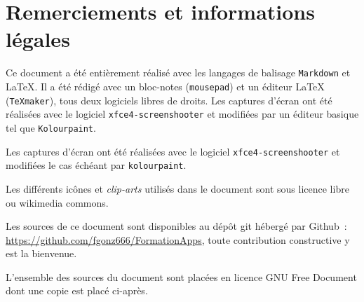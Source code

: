 \chapter{Remerciements et informations légales}

Ce document a été entièrement réalisé avec les langages de balisage \texttt{Markdown} et \LaTeX{}. 
Il a été rédigé avec un bloc-notes (\texttt{mousepad}) et un éditeur \LaTeX{} (\texttt{\TeX{}maker}), tous deux logiciels libres de droits.
Les captures d'écran ont été réalisées avec le logiciel \texttt{xfce4-screenshooter} et modifiées par un éditeur basique tel que \texttt{Kolourpaint}.

Les captures d'écran ont été réalisées avec le logiciel \texttt{xfce4-screenshooter} et modifiées le cas échéant par \texttt{kolourpaint}.

Les différents icônes et \emph{clip-arts\/} utilisés dans le document sont sous licence libre ou wikimedia commons.

Les sources de ce document sont disponibles au dépôt git hébergé par Github~: \url{https://github.com/fgonz666/FormationApps}, toute contribution constructive y est la bienvenue.

L'ensemble des sources du document sont placées en licence GNU Free Document dont une copie est placé ci-après.